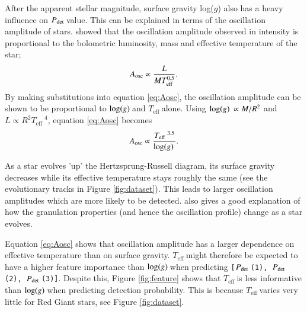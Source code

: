 \documentclass[a4paper,fleqn,usenatbib,useAMS]{mnras}
\newcommand{\numax}{\ensuremath{\nu_{\textrm{max}}}}
\newcommand{\teff}{\ensuremath{T_{\textrm{eff}}\:}}
\newcommand{\pdet}{\ensuremath{P_{\rm det}\:}}
\newcommand{\logg}{\ensuremath{{\rm log}(g)\:}}
\begin{document}
After the apparent stellar magnitude, surface gravity log($g$) also has a heavy influence on \pdet value. This can be explained in terms of the oscillation amplitude of stars. \citet{kjeldsen_amplitudes_1995} showed that the oscillation amplitude observed in intensity is proportional to the bolometric luminosity, mass and effective temperature of the star;
\begin{equation}
A_{\rm osc} \propto \frac{L}{MT_{\rm eff}^{0.5}}.
\label{eq:Aosc}
\end{equation}
By making substitutions into equation \ref{eq:Aosc}, the oscillation amplitude can be shown to be proportional to \logg and \teff alone. Using $\logg \propto M/R^{2}$ and $L \propto R^{2}\teff^{4}$, equation \ref{eq:Aosc} becomes
\begin{equation}
A_{\rm osc} \propto \frac{\teff^{3.5}}{\logg} .
\end{equation}

As a star evolves 'up' the Hertzsprung-Russell diagram, its surface gravity decreases while its effective temperature stays roughly the same (see the evolutionary tracks in Figure \ref{fig:dataset}). This leads to larger oscillation amplitudes which are more likely to be detected. \citet{mathur_granulation_2011} also gives a good explanation of how the granulation properties (and hence the oscillation profile) change as a star evolves. 


Equation \ref{eq:Aosc} shows that oscillation amplitude has a larger dependence on effective temperature than on surface gravity. \teff might therefore be expected to have a higher feature importance than \logg when predicting \texttt{[\pdet(1), \pdet(2), \pdet(3)]}. Despite this, Figure \ref{fig:feature} shows that \teff is less informative than \logg when predicting detection probability. This is because \teff varies very little for Red Giant stars, see Figure \ref{fig:dataset}.
\end{document}
